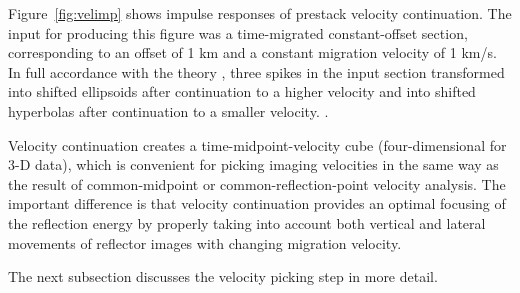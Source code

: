 \par  
Figure~\ref{fig:velimp} shows impulse responses of prestack velocity
continuation. The input for producing this figure was a time-migrated
constant-offset section, corresponding to an offset of 1 km and a constant
migration velocity of 1 km/s. In full accordance with the theory \cite[]{first},
three spikes in the input section transformed into shifted ellipsoids after
continuation to a higher velocity and into shifted hyperbolas after
continuation to a smaller velocity. 
\cite[]{Fomel.sep.97.sergey2}.

\par

Velocity continuation creates a time-midpoint-velocity cube (four-dimensional
for 3-D data), which is convenient for picking imaging velocities in the same
way as the result of common-midpoint or common-reflection-point velocity
analysis. The important difference is that velocity continuation provides an
optimal focusing of the reflection energy by properly taking into account both
vertical and lateral movements of reflector images with changing migration
velocity. 

\begin{comment}
Figure \ref{fig:consmb} compares velocity spectra
(semblance panels) at a CIP location of about 11.5 km after residual
NMO and after prestack velocity continuation. Although the overall
difference between the two panels is small, the velocity continuation
panel shows a noticeably better focusing, especially in the region of
conflicting dips between 1 and 2 seconds. 
\end{comment}
The next subsection discusses
the velocity picking step in more detail.

